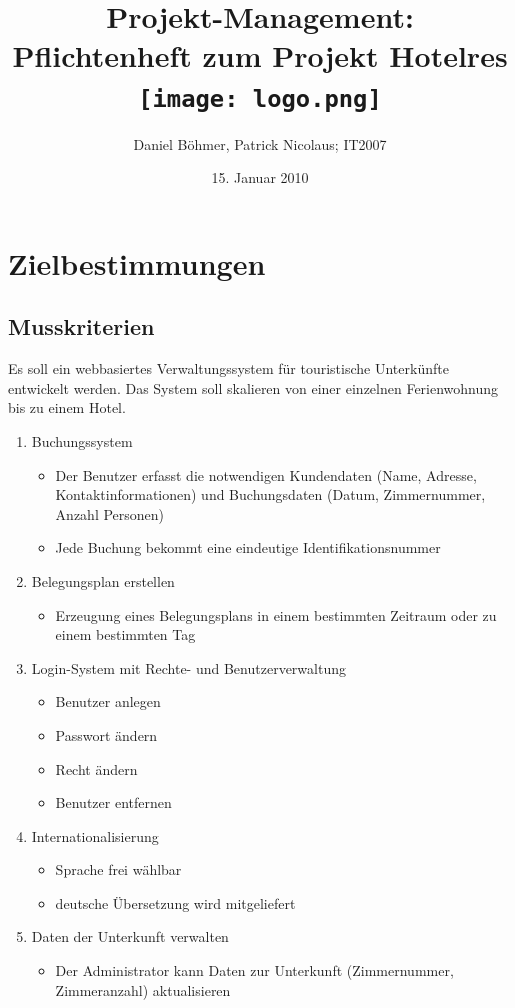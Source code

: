 \documentclass[a4paper,oneside]{scrreprt}
\author{Daniel Böhmer, Patrick Nicolaus; IT2007}
\date{15. Januar 2010}
\title{Projekt-Management:\\Pflichtenheft zum Projekt Hotelres \\
    \vspace{2 cm} \texttt{[image: logo.png]}}
\begin{document}
\maketitle{}

\tableofcontents{}



\chapter{Zielbestimmungen}

\section{Musskriterien}

Es soll ein webbasiertes Verwaltungssystem für touristische Unterkünfte entwickelt werden. Das System soll skalieren von einer einzelnen Ferienwohnung bis zu einem Hotel.

\begin{enumerate}
\item Buchungssystem
    \begin{itemize}
    \item Der Benutzer erfasst die notwendigen Kundendaten (Name, Adresse, Kontaktinformationen) und Buchungsdaten (Datum, Zimmernummer, Anzahl Personen)
    \item Jede Buchung bekommt eine eindeutige Identifikationsnummer
    \end{itemize}

\item Belegungsplan erstellen
    \begin{itemize}
    \item Erzeugung eines Belegungsplans in einem bestimmten Zeitraum oder zu einem bestimmten Tag 
    \end{itemize}

\item Login-System mit Rechte- und Benutzerverwaltung
    \begin{itemize}
    \item Benutzer anlegen
    \item Passwort ändern
    \item Recht ändern
    \item Benutzer entfernen
    \end{itemize}

\item Internationalisierung
    \begin{itemize}
    \item Sprache frei wählbar
    \item deutsche Übersetzung wird mitgeliefert
    \end{itemize}

\item Daten der Unterkunft verwalten
    \begin{itemize}
    \item Der Administrator kann Daten zur Unterkunft (Zimmernummer, Zimmeranzahl) aktualisieren
    \end{itemize}
\end{enumerate}
\end{document}
